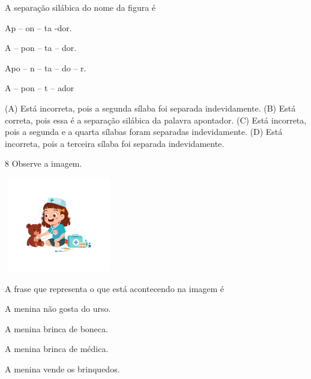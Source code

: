 
A separação silábica do nome da figura é

\begin{escolha}
\item Ap -- on -- ta -dor.

\item A -- pon -- ta -- dor.

\item Apo -- n -- ta -- do -- r.

\item A -- pon -- t -- ador
\end{escolha}


(A) Está incorreta, pois a segunda sílaba foi separada indevidamente.
(B) Está correta, pois essa é a separação silábica da palavra apontador.
(C) Está incorreta, pois a segunda e a quarta sílabas foram separadas indevidamente.
(D) Está incorreta, pois a terceira sílaba foi separada indevidamente.

\num{8} Observe a imagem.

\includegraphics[width=1.87273in,height=1.62645in]{media/image169.jpeg}


A frase que representa o que está acontecendo na imagem é

\begin{escolha}
\item A menina não gosta do urso.

\item A menina brinca de boneca.

\item A menina brinca de médica.

\item A menina vende os brinquedos.
\end{escolha}

